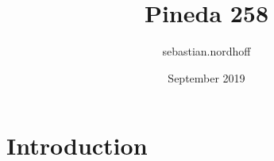 \documentclass{article}
\title{Pineda 258}
\author{sebastian.nordhoff }
\date{September 2019}
\begin{document}
\maketitle

\section{Introduction}
\end{document}
